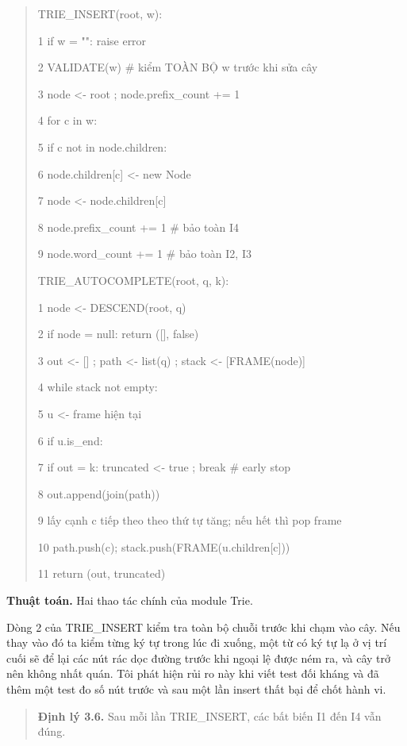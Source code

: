 \begin{quote}
TRIE\_INSERT(root, w):

1 if w = "": raise error

2 VALIDATE(w) \# kiểm TOÀN BỘ w trước khi sửa cây

3 node \textless- root ; node.prefix\_count += 1

4 for c in w:

5 if c not in node.children:

6 node.children{[}c{]} \textless- new Node

7 node \textless- node.children{[}c{]}

8 node.prefix\_count += 1 \# bảo toàn I4

9 node.word\_count += 1 \# bảo toàn I2, I3

TRIE\_AUTOCOMPLETE(root, q, k):

1 node \textless- DESCEND(root, q)

2 if node = null: return ({[}{]}, false)

3 out \textless- {[}{]} ; path \textless- list(q) ; stack \textless-
{[}FRAME(node){]}

4 while stack not empty:

5 u \textless- frame hiện tại

6 if u.is\_end:

7 if \textbar out\textbar{} = k: truncated \textless- true ; break \#
early stop

8 out.append(join(path))

9 lấy cạnh c tiếp theo theo thứ tự tăng; nếu hết thì pop frame

10 path.push(c); stack.push(FRAME(u.children{[}c{]}))

11 return (out, truncated)
\end{quote}

\begin{center}
\textbf{Thuật toán.} Hai thao tác chính của module Trie.
\end{center}

Dòng 2 của TRIE\_INSERT kiểm tra toàn bộ chuỗi trước khi chạm vào cây.
Nếu thay vào đó ta kiểm từng ký tự trong lúc đi xuống, một từ có ký tự
lạ ở vị trí cuối sẽ để lại các nút rác dọc đường trước khi ngoại lệ được
ném ra, và cây trở nên không nhất quán. Tôi phát hiện rủi ro này khi
viết test đối kháng và đã thêm một test đo số nút trước và sau một lần
insert thất bại để chốt hành vi.

\begin{quote}
\textbf{Định lý 3.6.} Sau mỗi lần TRIE\_INSERT, các bất biến I1 đến I4
vẫn đúng.
\end{quote}

